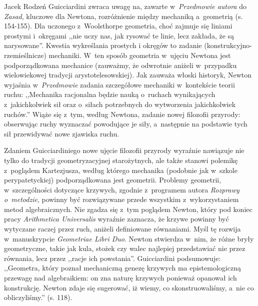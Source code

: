 \begin{recplenv}{Jacek Rodzeń}
Guicciardini zwraca uwagę na, zawarte w~\textit{Przedmowie autora} do \textit{Zasad}, kluczowe dla Newtona,
rozróżnienie między mechaniką a~geometrią (s. 154-155). Dla uczonego z~Woolsthorpe geometria, choć zajmuje się liniami
prostymi i~okręgami ,,nie uczy nas, jak rysować te linie, lecz zakłada, że są narysowane''. Kwestia wykreślania prostych
i okręgów to zadanie (konstrukcyjno-rzemieślnicze) mechaniki. W~ten sposób geometria w~ujęciu Newtona jest
podporządkowana mechanice (zauważmy, że odwrotnie aniżeli w~przypadku wielowiekowej tradycji arystotelesowskiej). Jak
zauważa włoski historyk, Newton wyjaśnia w~\textit{Przedmowie} zadania szczegółowe mechaniki w~kontekście teorii ruchu:
,,Mechanika racjonalna będzie nauką o~ruchach wynikających z~jakichkolwiek sił oraz o~siłach potrzebnych do wytworzenia
jakichkolwiek ruchów.'' Wiąże się z~tym, według Newtona, zadanie nowej filozofii przyrody: obserwując ruchy wyznaczać
powodujące je siły, a~następnie na podstawie tych sił przewidywać nowe zjawiska ruchu. 

Zdaniem Guicciardiniego nowe ujęcie filozofii przyrody wyraźnie nawiązuje nie tylko do tradycji geometryzacyjnej
starożytnych, ale także stanowi polemikę z~poglądem Kartezjusza, według którego mechanika (podobnie jak w~szkole
perypatetyckiej) podporządkowana jest geometrii. Problemy geometrii, w~szczególności dotyczące krzywych,
zgodnie z~programem autora \textit{Rozprawy o~metodzie}, powinny być rozwiązywane przede wszystkim z~wykorzystaniem metod
algebraicznych. Nie zgadza się z~tym poglądem Newton, który pod koniec pracy \textit{Arithmetica Universalis} wyraźnie
zaznacza, że krzywe powinny być wytyczane raczej przez ruch, aniżeli definiowane równaniami. Myśl tę
rozwija w~manuskrypcie \textit{Geometriae Libri Duo}. Newton stwierdza w~nim, że różne bryły geometryczne,
takie jak kula, stożek
czy walec najlepiej przedstawiać nie przez równania, lecz przez ,,racje ich powstania''. Guicciardini podsumowuje:
,,Geometra, który poznał mechaniczną genezę krzywych ma epistemologiczną przewagę nad algebraikiem: on zna naturę
krzywych ponieważ opanował ich konstrukcję. Newton zdaje się sugerować, iż wiemy, co skonstruowaliśmy, a~nie co
obliczyliśmy.'' (s. 118).


\end{recplenv}
